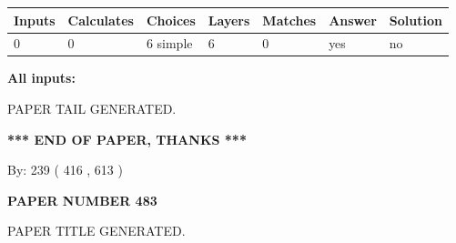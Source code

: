 \documentclass{ctexart}
\begin{document}
 
   
   
   
   
\noindent\begin{tabular}{|l|l|l|l|l|l|l|}
 \hline
Inputs & Calculates & Choices & Layers & Matches & Answer & Solution \\ \hline
 0  & 
 0  & 
 6
  simple  
  & 
 6  & 
 0  & 
  yes & 
  no 
  \\ \hline
 \end{tabular}
   
   
   
   
\noindent{}
   
   
   
   
\noindent\vspace{0.1in}\hspace{-0.08in} {\textbf{\Large{All inputs: }}}
   
   
   
   
   
   
 \vspace{0.2in}
 
   
   
\vspace{2.0in} PAPER TAIL GENERATED.
   
   
   
   
\vspace{1.0in} 
{\textbf{\large{ *** END OF PAPER, THANKS *** }}} 
   
   
\hspace{1.0in} By: 
 239 ( 416 ,  613 )
   
   
   
   
\newpage 
\setcounter{page}{ 
   483001 } 
   
   
   
   
 {\textbf{ \Large{ PAPER NUMBER  483  }}}
   
   
\vspace{0.2in}
   
   
   
   
   
   
   
   
 \vspace{0.2in}
 
 
 
 
   
   
 PAPER TITLE GENERATED.
   
\end{document}
